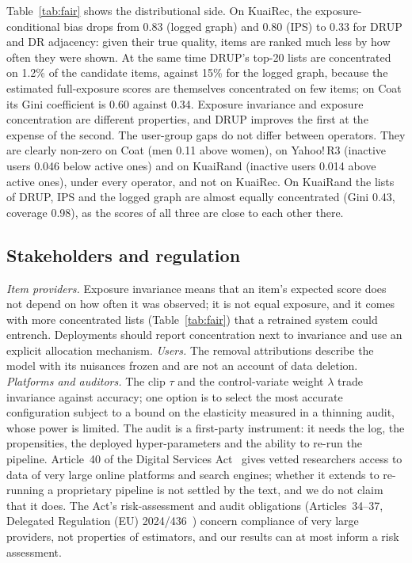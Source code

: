 Table~\ref{tab:fair} shows the distributional side. On KuaiRec, the
exposure-conditional bias drops from 0.83 (logged graph) and 0.80 (IPS) to 0.33
for DRUP and DR adjacency: given their true quality, items are ranked much less
by how often they were shown. At the same time DRUP's top-20 lists are
concentrated on 1.2\% of the candidate items, against 15\% for the logged graph,
because the estimated full-exposure scores are themselves concentrated on few items; on Coat its Gini
coefficient is 0.60 against 0.34. Exposure invariance and exposure concentration
are different properties, and DRUP improves the first at the expense of the
second. The user-group gaps do not differ between operators. They are clearly
non-zero on Coat (men 0.11 above women), on Yahoo!\,R3 (inactive users 0.046
below active ones) and on KuaiRand (inactive users 0.014 above active ones), under every
operator, and not on KuaiRec. On KuaiRand the lists of DRUP, IPS and the logged graph
are almost equally concentrated (Gini 0.43, coverage 0.98), as the scores of all
three are close to each other there.


\subsection{Stakeholders and regulation}\label{sec:stake}
\emph{Item providers.} Exposure invariance means that an item's expected score does not
depend on how often it was observed; it is not equal exposure, and it comes with more
concentrated lists (Table~\ref{tab:fair}) that a retrained system could entrench.
Deployments should report concentration next to invariance and use an explicit allocation
mechanism. \emph{Users.} The removal attributions describe the model with its nuisances
frozen and are not an account of data deletion. \emph{Platforms and auditors.} The clip
$\tau$ and the control-variate weight $\lambda$ trade invariance against accuracy; one
option is to select the most accurate configuration subject to a bound on the elasticity
measured in a thinning audit, whose power is limited. The audit is a first-party
instrument: it needs the log, the propensities, the deployed hyper-parameters and the
ability to re-run the pipeline. Article~40 of the Digital Services
Act~\citep{dsa2022} gives vetted researchers access to data of very large online platforms
and search engines; whether it extends to re-running a proprietary pipeline is not settled
by the text, and we do not claim that it does. The Act's risk-assessment and audit
obligations (Articles~34--37, Delegated Regulation (EU) 2024/436~\citep{eu2024audit})
concern compliance of very large providers, not properties of estimators, and our results
can at most inform a risk assessment.
